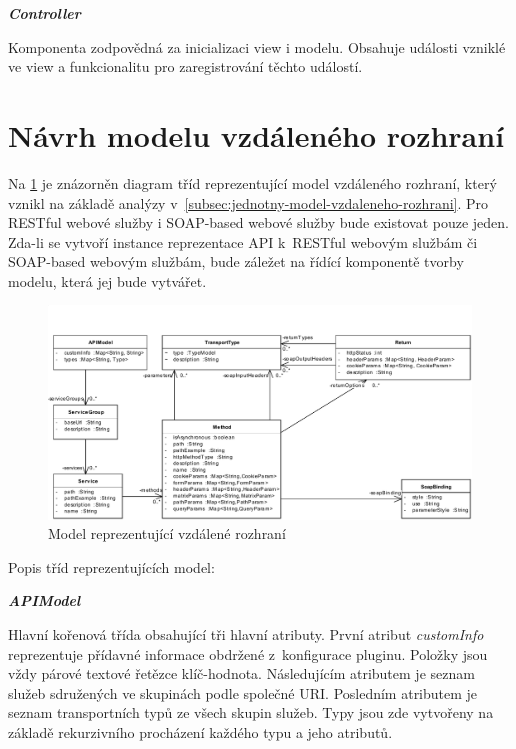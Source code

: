 \documentclass[11pt,twoside,a4paper]{book}
\begin{document}
\textbf{\textit{Controller}}

Komponenta zodpovědná za inicializaci view i modelu. Obsahuje události vzniklé ve view a
funkcionalitu pro zaregistrování těchto událostí.

\section{Návrh modelu vzdáleného rozhraní}

Na \ref{fig:navrh-modelu} je znázorněn diagram tříd reprezentující model
vzdáleného rozhraní, který vznikl na základě analýzy
v~\ref{subsec:jednotny-model-vzdaleneho-rozhrani}. Pro RESTful webové služby i
SOAP-based webové služby bude existovat pouze jeden. Zda-li se vytvoří instance
reprezentace API k~RESTful webovým službám či SOAP-based webovým službám, bude
záležet na řídící komponentě tvorby modelu, která jej bude vytvářet.

\begin{figure}[h]
\begin{center}
\includegraphics[width=13cm]{images-pdf/UniversalModel.pdf}
\caption{Model reprezentující vzdálené rozhraní}
\label{fig:navrh-modelu}
\end{center}
\end{figure}

Popis tříd reprezentujících model:

\textbf{\textit{APIModel}}

Hlavní kořenová třída obsahující tři hlavní atributy. První atribut {\em
customInfo} reprezentuje přídavné informace obdržené z~konfigurace pluginu.
Položky jsou vždy párové textové řetězce klíč-hodnota. Následujícím atributem je
seznam služeb sdružených ve skupinách podle společné URI. Posledním atributem je
seznam transportních typů ze všech skupin služeb. Typy jsou zde vytvořeny na
základě rekurzivního procházení každého typu a jeho atributů.
\end{document}
